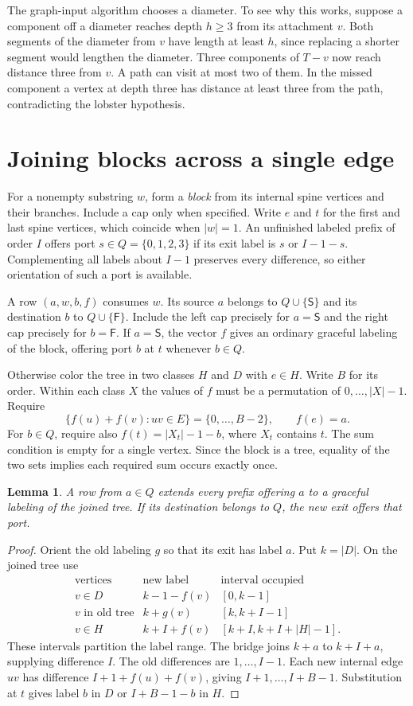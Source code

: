 \documentclass[11pt,a4paper]{article}
\newtheorem{lemma}[theorem]{Lemma}
\newcommand{\start}{\mathsf S}
\newcommand{\finish}{\mathsf F}
\begin{document}
The graph-input algorithm chooses a diameter. To see why this works, suppose a component off a diameter reaches depth $h\ge3$ from its attachment $v$. Both segments of the diameter from $v$ have length at least $h$, since replacing a shorter segment would lengthen the diameter. Three components of $T-v$ now reach distance three from $v$. A path can visit at most two of them. In the missed component a vertex at depth three has distance at least three from the path, contradicting the lobster hypothesis.

\newpage
\section{Joining blocks across a single edge}
For a nonempty substring $w$, form a \emph{block} from its internal spine vertices and their branches. Include a cap only when specified. Write $e$ and $t$ for the first and last spine vertices, which coincide when $|w|=1$. An unfinished labeled prefix of order $I$ offers port $s\in Q=\{0,1,2,3\}$ if its exit label is $s$ or $I-1-s$. Complementing all labels about $I-1$ preserves every difference, so either orientation of such a port is available.

A row $(a,w,b,f)$ consumes $w$. Its source $a$ belongs to $Q\cup\{\start\}$ and its destination $b$ to $Q\cup\{\finish\}$. Include the left cap precisely for $a=\start$ and the right cap precisely for $b=\finish$. If $a=\start$, the vector $f$ gives an ordinary graceful labeling of the block, offering port $b$ at $t$ whenever $b\in Q$.

Otherwise color the tree in two classes $H$ and $D$ with $e\in H$. Write $B$ for its order. Within each class $X$ the values of $f$ must be a permutation of $0,\ldots,|X|-1$. Require
\[
 \{f(u)+f(v): uv\in E\}=\{0,\ldots,B-2\},\qquad f(e)=a .
\]
For $b\in Q$, require also $f(t)=|X_t|-1-b$, where $X_t$ contains $t$. The sum condition is empty for a single vertex. Since the block is a tree, equality of the two sets implies each required sum occurs exactly once.

\begin{lemma}\label{join}
A row from $a\in Q$ extends every prefix offering $a$ to a graceful labeling of the joined tree. If its destination belongs to $Q$, the new exit offers that port.
\end{lemma}
\begin{proof}
Orient the old labeling $g$ so that its exit has label $a$. Put $k=|D|$. On the joined tree use
\[
\begin{array}{c|c|c}
\text{vertices}&\text{new label}&\text{interval occupied}\\\hline
v\in D & k-1-f(v)&[0,k-1]\\
v\text{ in old tree}&k+g(v)&[k,k+I-1]\\
v\in H&k+I+f(v)&[k+I,k+I+|H|-1].
\end{array}
\]
These intervals partition the label range. The bridge joins $k+a$ to $k+I+a$, supplying difference $I$. The old differences are $1,\ldots,I-1$. Each new internal edge $uv$ has difference $I+1+f(u)+f(v)$, giving $I+1,\ldots,I+B-1$. Substitution at $t$ gives label $b$ in $D$ or $I+B-1-b$ in $H$.
\end{proof}
\end{document}
